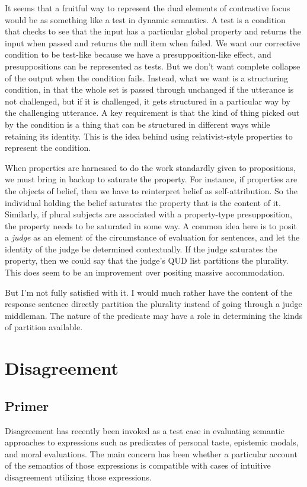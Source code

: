\documentclass[letterpaper,10pt]{article}
\begin{document}
It seems that a fruitful way to represent the dual elements of contrastive focus would be as something like a test in dynamic semantics.  A test is a condition that checks to see that the input has a particular global property and returns the input when passed and returns the null item when failed.  We want our corrective condition to be test-like because we have a presupposition-like effect, and presuppositions can be represented as tests.  But we don't want complete collapse of the output when the condition fails.  Instead, what we want is a structuring condition, in that the whole set is passed through unchanged if the utterance is not challenged, but if it is challenged, it gets structured in a particular way by the challenging utterance.  A key requirement is that the kind of thing picked out by the condition is a thing that can be structured in different ways while retaining its identity.  This is the idea behind using relativist-style properties to represent the condition.

When properties are harnessed to do the work standardly given to propositions, we must bring in backup to saturate the property.  For instance, if properties are the objects of belief, then we have to reinterpret belief as self-attribution.  So the individual holding the belief saturates the property that is the content of it.  Similarly, if plural subjects are associated with a property-type presupposition, the property needs to be saturated in some way.  A common idea here is to posit a \textit{judge} as an element of the circumstance of evaluation for sentences, and let the identity of the judge be determined contextually.  If the judge saturates the property, then we could say that the judge's QUD list partitions the plurality.  This does seem to be an improvement over positing massive accommodation.  

But I'm not fully satisfied with it.  I would much rather have the content of the response sentence directly partition the plurality instead of going through a judge middleman.  The nature of the predicate may have a role in determining the kinds of partition available.



\section{Disagreement}

\subsection{Primer}
Disagreement has recently been invoked as a test case in evaluating semantic approaches to expressions such as predicates of personal taste, epistemic modals, and moral evaluations.  The main concern has been whether a particular account of the semantics of those expressions is compatible with cases of intuitive disagreement utilizing those expressions.
\end{document}
